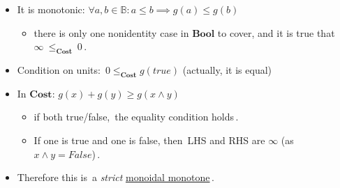 \begin{itemize}
    \item  It is monotonic:  $\forall a,b \in \mathbb{B}: a\leq b \implies g(a)\leq g(b)$
          \begin{itemize}
            \item there is only one nonidentity case in $\mathbf{Bool}$ to cover, and it is true that \,$\infty\ \leq_\mathbf{Cost}\ 0$\,.
          \end{itemize}
    \item Condition on units: \,$0 \leq_\mathbf{Cost} g(true)$ (actually, it is equal)\,
    \item In $\mathbf{Cost}$: $g(x) + g(y) \geq g(x \land y)$
          \begin{itemize}
            \item if both true/false, \,the equality condition holds\,.
            \item If one is true and one is false, then \,LHS and RHS are $\infty$ (as $x \land y = False$)\,.
          \end{itemize}
    \item Therefore this is \,a \emph{strict} \href{doc/1 math/Seven Sketches in Compositionality/Chapter 2: Resource theories/2 Symmetric monoidal preorders/5 Monoidal monotone maps/1 Monoidal monotone}{monoidal monotone}\,.

  \end{itemize}
